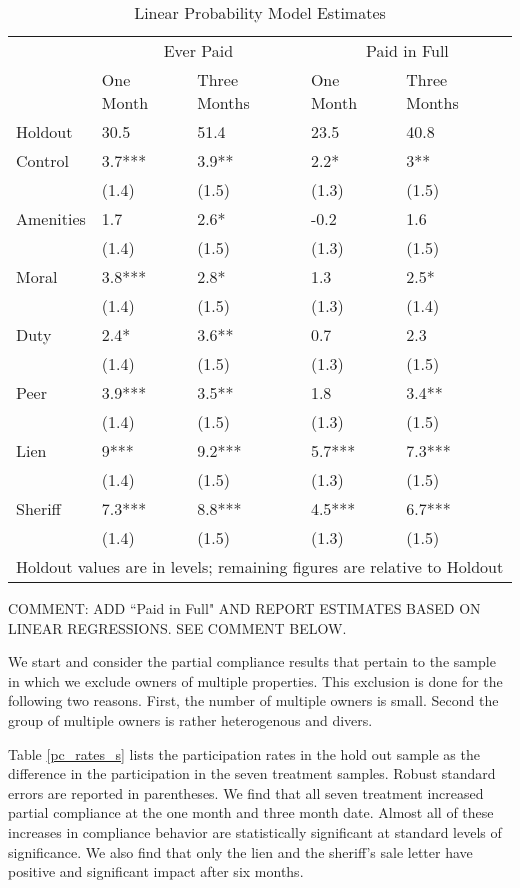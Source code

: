 \documentclass[12pt]{article}
\begin{document}
\begin{table}[ht]
\centering
\caption{Linear Probability Model Estimates} 
\label{tbl:marg_3mo}
\begin{tabular}{lllll}
  \hline
   & \multicolumn{2}{c}{Ever Paid} & 
             \multicolumn{2}{c}{Paid in Full} \\
 & One Month & Three Months & One Month & Three Months \\
Holdout & 30.5 & 51.4 & 23.5 & 40.8 \\ 
   \hline
Control & 3.7*** & 3.9** & 2.2* & 3** \\ 
   & (1.4) & (1.5) & (1.3) & (1.5) \\ 
  Amenities & 1.7 & 2.6* & -0.2 & 1.6 \\ 
   & (1.4) & (1.5) & (1.3) & (1.5) \\ 
  Moral & 3.8*** & 2.8* & 1.3 & 2.5* \\ 
   & (1.4) & (1.5) & (1.3) & (1.4) \\ 
  Duty & 2.4* & 3.6** & 0.7 & 2.3 \\ 
   & (1.4) & (1.5) & (1.3) & (1.5) \\ 
  Peer & 3.9*** & 3.5** & 1.8 & 3.4** \\ 
   & (1.4) & (1.5) & (1.3) & (1.5) \\ 
  Lien & 9*** & 9.2*** & 5.7*** & 7.3*** \\ 
   & (1.4) & (1.5) & (1.3) & (1.5) \\ 
  Sheriff & 7.3*** & 8.8*** & 4.5*** & 6.7*** \\ 
   & (1.4) & (1.5) & (1.3) & (1.5) \\ 
   
 \hline 
 \multicolumn{5}{l}{\scriptsize{Holdout values are in levels; remaining figures are relative to Holdout}} \\ 
\end{tabular}
\end{table}

COMMENT: ADD ``Paid in Full" AND REPORT ESTIMATES BASED ON LINEAR REGRESSIONS. SEE COMMENT BELOW.


We start and consider the partial compliance results that pertain to the sample in which we exclude owners of multiple properties. This exclusion is done for the following two reasons. First, the number of multiple owners is small. Second the group of multiple owners is rather heterogenous and divers.

Table \ref{pc_rates_s} lists the participation rates
in the hold out sample as the difference in the participation in the seven treatment samples. Robust 
standard errors are reported in parentheses. We find that all seven treatment increased partial compliance
at the one month and three month date. Almost all of these increases in compliance behavior are statistically 
significant at standard levels of significance. We also find that only the lien and the sheriff's sale letter have positive and significant impact after six months.
\end{document}
